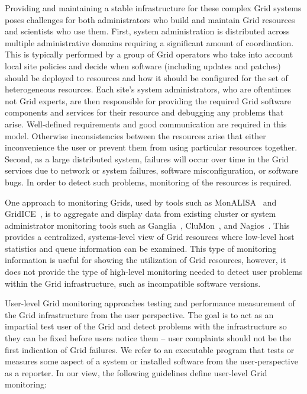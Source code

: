 \documentclass[times,10pt,twocolumn]{article}
\begin{document}
Providing and maintaining a stable infrastructure for these complex 
Grid systems poses challenges for both administrators who build and
maintain Grid resources and scientists who use them.  First, system
administration is distributed across multiple administrative domains 
requiring a significant amount of coordination.  This is typically performed by
a group of Grid operators who take into account local site policies 
and decide when software (including updates and patches) should be deployed to
resources and how it should be configured for the set of heterogeneous
resources.  Each site's system administrators, who are oftentimes not Grid
experts, are then responsible for providing the required Grid software
components and services for their resource and debugging any problems that
arise.  Well-defined requirements and good communication are required in this
model.  Otherwise inconsistencies between the resources arise that either
inconvenience the user or prevent them from using particular resources
together.  Second, as a large distributed system, failures will occur over
time in the Grid services due to network or system failures, software
misconfiguration, or software bugs.  In order to detect such problems, 
monitoring of the resources is required.  

One approach to monitoring Grids, used by tools such as
MonALISA~\cite{monalisa} and GridICE~\cite{gridice}, is to aggregate and
display data from existing cluster or system administrator monitoring tools
such as Ganglia~\cite{ganglia}, CluMon~\cite{clumon}, and
Nagios~\cite{nagios}.  This provides a centralized, systems-level view of Grid
resources where low-level host statistics and queue information can be
examined.  This type of monitoring information is useful for showing the
utilization of Grid resources, however, it does not provide the type of
high-level monitoring needed to detect user problems within the Grid
infrastructure, such as incompatible software versions.  

User-level Grid monitoring approaches testing and performance measurement of
the Grid infrastructure from the user perspective.  The goal is to act as an
impartial test user of the Grid and detect problems with the infrastructure so
they can be fixed before users notice them -- user complaints should not be
the first indication of Grid failures.  We refer to an executable program that
tests or measures some aspect of a system or installed software from the
user-perspective as a reporter.  In our view, the following guidelines 
define user-level Grid monitoring: 
\end{document}
